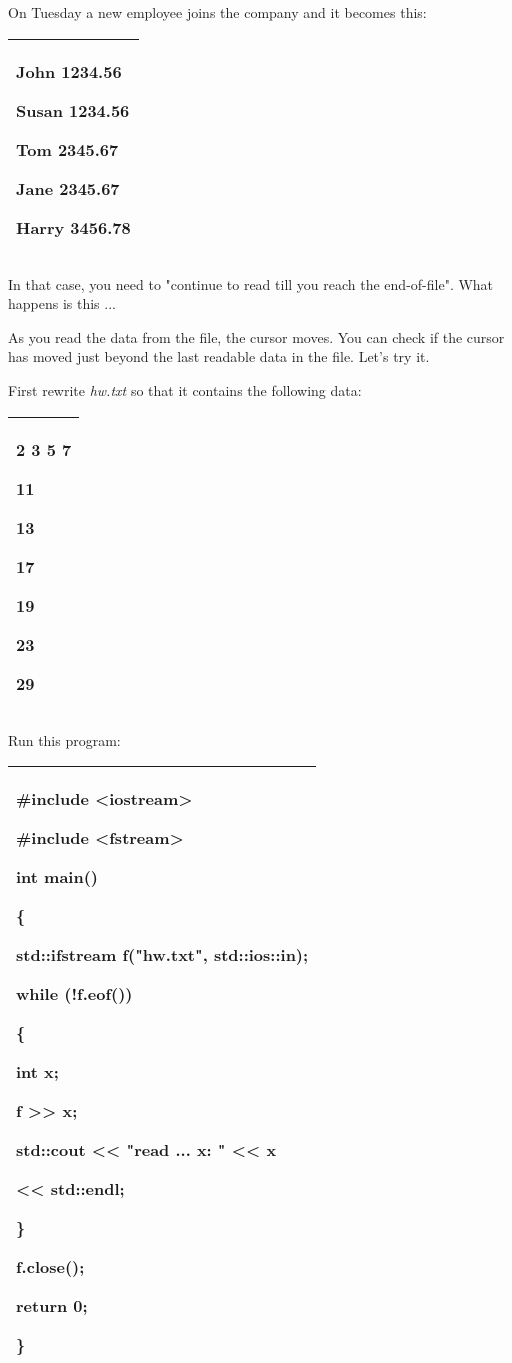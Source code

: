 \documentclass[
]{article}
\begin{document}
On Tuesday a new employee joins the company and it becomes this:

\begin{longtable}[]{@{}l@{}}
\toprule
\endhead
\begin{minipage}[t]{0.97\columnwidth}\raggedright
John 1234.56

Susan 1234.56

Tom 2345.67

Jane 2345.67

Harry 3456.78\strut
\end{minipage}\tabularnewline
\bottomrule
\end{longtable}

In that case, you need to "continue to read till you reach the
end-of-file". What happens is this ...

As you read the data from the file, the cursor moves. You can check if
the cursor has moved just beyond the last readable data in the file.
Let's try it.

First rewrite \emph{hw.txt} so that it contains the following data:

\begin{longtable}[]{@{}l@{}}
\toprule
\endhead
\begin{minipage}[t]{0.97\columnwidth}\raggedright
2 3 5 7

11

13

17

19

23

29\strut
\end{minipage}\tabularnewline
\bottomrule
\end{longtable}

Run this program:

\begin{longtable}[]{@{}l@{}}
\toprule
\endhead
\begin{minipage}[t]{0.97\columnwidth}\raggedright
\#include \textless iostream\textgreater{}

\#include \textless fstream\textgreater{}

int main()

\{

std::ifstream f("hw.txt", std::ios::in);

while (!\textbf{f.eof()})

\{

int x;

f \textgreater\textgreater{} x;

std::cout \textless\textless{} "read ... x: " \textless\textless{} x

\textless\textless{} std::endl;

\}

f.close();

return 0;

\}\strut
\end{minipage}\tabularnewline
\bottomrule
\end{longtable}
\end{document}
